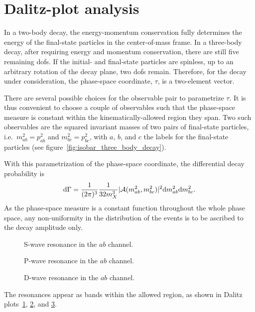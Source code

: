\section{Dalitz-plot analysis}

    In a two-body decay, the energy-momentum conservation fully determines the energy of the final-state particles in the center-of-mass frame.
    In a three-body decay, after requiring energy and momentum conservation, there are still five remaining \acp{dof}.
    If the initial- and final-state particles are spinless, up to an arbitrary rotation of the decay plane, two \acp{dof} remain.
    Therefore, for the decay under consideration, the phase-space coordinate, $\tau$, is a two-element vector.

   
   There are several possible choices for the observable pair to parametrize $\tau$.
    It is thus convenient to choose a couple of observables such that the phase-space measure is constant within the kinematically-allowed region they span.
    Two such observables are the squared invariant masses of two pairs of final-state particles, i.e.~$m_{ab}^2 = p_{ab}^2$ and $m_{bc}^2 = p_{bc}^2$, with $a$, $b$, and $c$ the labels for the final-state particles (see figure~\ref{fig:isobar_three_body_decay}).


    With this parametrization of the phase-space coordinate, the differential decay probability is~\cite[\S~13.1.1]{Bevan:2014iga}
    \begin{equation}
        \mathop{}\!\textup{d}\Gamma = \frac{1}{(2\pi)^3}\frac{1}{32 m_X^3}\lvert\mathcal{A}(m_{ab}^2, m_{bc}^2)\rvert^2\!
        \mathop{}\!\textup{d} m_{ab}^2 \!\mathop{}\!\textup{d} m_{bc}^2.
    \end{equation}
    As the phase-space measure is a constant function throughout the whole phase space, any non-uniformity in the distribution of the events is to be ascribed to the decay amplitude only.
    \begin{figure}
        \centering
        
        \caption{S-wave resonance in the $ab$ channel.}
        \label{fig:s_wave_resonance_example}
    \end{figure}
    \begin{figure}
        \centering
        
        \caption{P-wave resonance in the $ab$ channel.}
        \label{fig:p_wave_resonance_example}
    \end{figure}
    \begin{figure}
        \centering
        
        \caption{D-wave resonance in the $ab$ channel.}
        \label{fig:d_wave_resonance_example}
    \end{figure}
    The resonances appear as bands within the allowed region, as shown in Dalitz plots~\ref{fig:s_wave_resonance_example}, \ref{fig:p_wave_resonance_example}, and \ref{fig:d_wave_resonance_example}.


